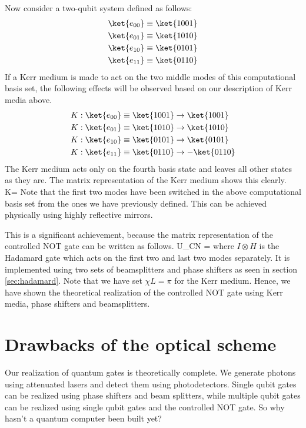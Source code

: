 Now consider a two-qubit system defined as follows:
\begin{align}
\ket{e_{00}} &\equiv \ket{1001}\\
\ket{e_{01}} &\equiv \ket{1010}\\
\ket{e_{10}} &\equiv \ket{0101}\\
\ket{e_{11}} &\equiv \ket{0110}
\end{align}
If a Kerr medium is made to act on the two middle modes of this computational basis set, the following effects will be observed based on our description of Kerr media above.
\begin{align}
K:\ket{e_{00}} &\equiv \ket{1001}\rightarrow \ket{1001}\\
K:\ket{e_{01}} &\equiv \ket{1010}\rightarrow \ket{1010}\\
K:\ket{e_{10}} &\equiv \ket{0101}\rightarrow \ket{0101}\\
K:\ket{e_{11}} &\equiv \ket{0110}\rightarrow -\ket{0110}
\end{align}
The Kerr medium acts only on the fourth basis state and leaves all other states as they are. The matrix representation of the Kerr medium shows this clearly.
\beq
K= 
\eeq
Note that the first two modes have been switched in the above computational basis set from the ones we have previously defined. This can be achieved physically using highly reflective mirrors.

This is a significant achievement, because the matrix representation of the controlled NOT gate can be written as follows.
\beq
U_{CN} = 
\eeq
where $I\otimes H$ is the Hadamard gate which acts on the first two and last two modes separately. It is implemented using two sets of beamsplitters and phase shifters as seen in section \ref{sec:hadamard}. Note that we have set $\chi L = \pi$ for the Kerr medium. Hence, we have shown the theoretical realization of the controlled NOT gate using Kerr media, phase shifters and beamsplitters.

\section{Drawbacks of the optical scheme}
Our realization of quantum gates is theoretically complete. We generate photons using attenuated lasers and detect them using photodetectors. Single qubit gates can be realized using phase shifters and beam splitters, while multiple qubit gates can be realized using single qubit gates and the controlled NOT gate. So why hasn't a quantum computer been built yet?

